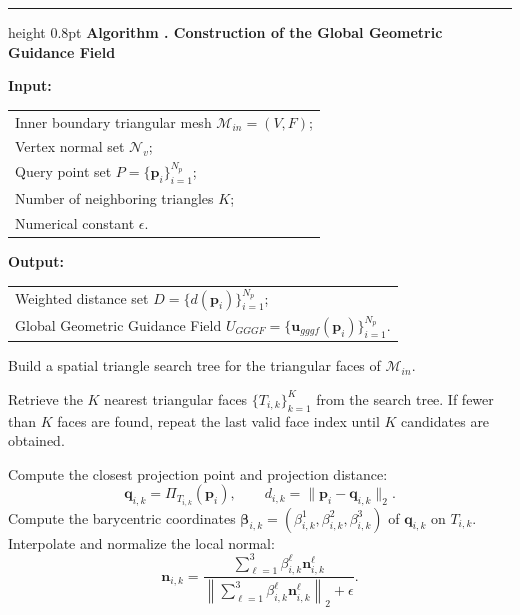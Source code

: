 \documentclass[%
 aip,
 amsmath,amssymb,
 reprint,%
nobibnotes,
]{revtex4-1}
\newcounter{algorithm}
\renewcommand{\thealgorithm}{\arabic{algorithm}}
\begin{document}
\begin{center}
    \begin{minipage}{0.96\columnwidth}
    \label{alg:gggf_procedure}
    \hrule height 0.8pt
    \vspace{0.45em}
    \noindent\textbf{Algorithm \thealgorithm. Construction of the Global Geometric Guidance Field}

    \vspace{0.35em}
    \small
    \noindent\textbf{Input:}\\[-0.2em]
    \begin{tabular}{@{\hspace{2.4em}}l@{}}
        Inner boundary triangular mesh $\mathcal{M}_{in}=(V,F)$;\\
        Vertex normal set $\mathcal{N}_v$;\\
        Query point set $P=\{\mathbf{p}_i\}_{i=1}^{N_p}$;\\
        Number of neighboring triangles $K$;\\
        Numerical constant $\epsilon$.
    \end{tabular}

    \noindent\textbf{Output:}\\[-0.2em]
    \begin{tabular}{@{\hspace{2.4em}}l@{}}
        Weighted distance set $D=\{d(\mathbf{p}_i)\}_{i=1}^{N_p}$;\\
        Global Geometric Guidance Field $U_{GGGF}=\{\mathbf{u}_{gggf}(\mathbf{p}_i)\}_{i=1}^{N_p}$.
    \end{tabular}

    \vspace{0.25em}
    \begin{algorithmic}[1]
        \STATE Build a spatial triangle search tree for the triangular faces of $\mathcal{M}_{in}$.

            \STATE Retrieve the $K$ nearest triangular faces $\{T_{i,k}\}_{k=1}^{K}$ from the search tree.
            \STATE If fewer than $K$ faces are found, repeat the last valid face index until $K$ candidates are obtained.

                \STATE Compute the closest projection point and projection distance:
                \[
                    \mathbf{q}_{i,k}=\Pi_{T_{i,k}}(\mathbf{p}_i),
                    \qquad
                    d_{i,k}=\|\mathbf{p}_i-\mathbf{q}_{i,k}\|_2 .
                \]
                \STATE Compute the barycentric coordinates $\boldsymbol{\beta}_{i,k}=(\beta_{i,k}^{1},\beta_{i,k}^{2},\beta_{i,k}^{3})$ of $\mathbf{q}_{i,k}$ on $T_{i,k}$.
                \STATE Interpolate and normalize the local normal:
                \[
                    \mathbf{n}_{i,k}
                    =
                    \frac{
                    \sum_{\ell=1}^{3}\beta_{i,k}^{\ell}\mathbf{n}_{i,k}^{\ell}
                    }{
                    \left\|\sum_{\ell=1}^{3}\beta_{i,k}^{\ell}\mathbf{n}_{i,k}^{\ell}\right\|_2+\epsilon
                    } .
                \]
            \ENDFOR


\end{algorithmic}
\end{minipage}
\end{center}
\end{document}
